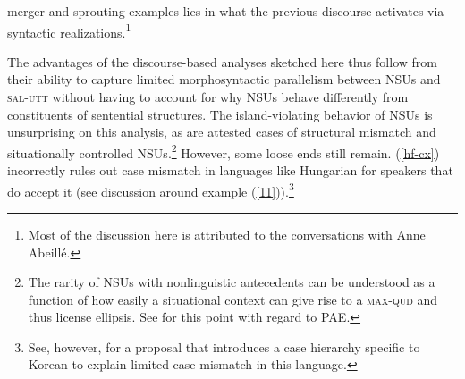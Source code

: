 {merger and sprouting examples lies in what the previous discourse
activates via syntactic realizations.\footnote{Most of the discussion
here is attributed to the conversations with Anne Abeill\'{e}.}
%
%
%
%
%
%
%

The advantages of the discourse-based analyses sketched here thus follow from their ability to capture limited morphosyntactic parallelism between NSUs and \textsc{sal-utt} without having to account for why NSUs behave differently from constituents of sentential structures. The island-violating behavior of NSUs is unsurprising on this analysis, as are attested cases of structural mismatch and situationally controlled NSUs.\footnote{The rarity of NSUs with nonlinguistic antecedents can be understood as a function of how easily a situational context can give rise to a \textsc{max-qud} and thus license ellipsis. See \citet{Miller2014b} for this point with regard to PAE.}
However, some loose ends still remain. (\ref{hf-cx}) %
incorrectly rules out case mismatch in languages like Hungarian for speakers that do accept it (see discussion around example (\ref{11})).\footnote{See, however, \citet{Kim2015} for a proposal that introduces a case hierarchy specific to Korean to explain limited case mismatch in this language.}



}
